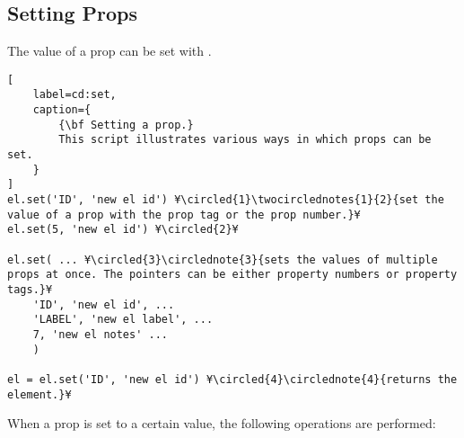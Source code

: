 \documentclass{tufte-handout}
\begin{document}
\subsection{Setting Props}

The value of a prop can be set with .
%
\begin{lstlisting}[
	label=cd:set,
	caption={
		{\bf Setting a prop.}
		This script illustrates various ways in which props can be set.
	}
]
el.set('ID', 'new el id') ¥\circled{1}\twocirclednotes{1}{2}{set the value of a prop with the prop tag or the prop number.}¥
el.set(5, 'new el id') ¥\circled{2}¥

el.set( ... ¥\circled{3}\circlednote{3}{sets the values of multiple props at once. The pointers can be either property numbers or property tags.}¥
	'ID', 'new el id', ...
	'LABEL', 'new el label', ...
	7, 'new el notes' ...
	) 

el = el.set('ID', 'new el id') ¥\circled{4}\circlednote{4}{returns the element.}¥
\end{lstlisting}
%
When a prop is set to a certain value, the following operations are performed:
\end{document}
